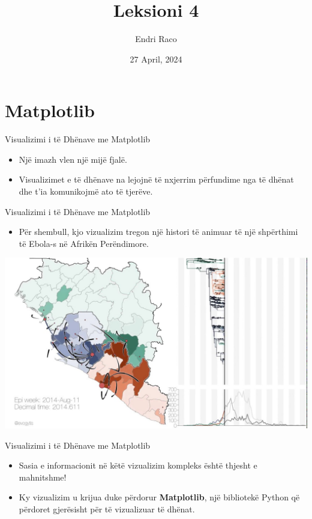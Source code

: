 \documentclass[
  ignorenonframetext,
]{beamer}
\title{Leksioni 4}
\author{Endri Raco}
\date{27 April, 2024}
\providecommand{\tightlist}{%
  \setlength{\itemsep}{0pt}\setlength{\parskip}{0pt}}
\begin{document}
\frame{\titlepage}

\begin{frame}[allowframebreaks]
  \tableofcontents[hideallsubsections]
\end{frame}
\hypertarget{matplotlib}{%
\section{Matplotlib}\label{matplotlib}}

\begin{frame}{Visualizimi i të Dhënave me Matplotlib}
\protect\hypertarget{visualizimi-i-tuxeb-dhuxebnave-me-matplotlib}{}
\begin{itemize}
\item
  Një imazh vlen një mijë fjalë.
\item
  Visualizimet e të dhënave na lejojnë të nxjerrim përfundime nga të
  dhënat dhe t'ia komunikojmë ato të tjerëve.
\end{itemize}
\end{frame}

\begin{frame}{Visualizimi i të Dhënave me Matplotlib}
\protect\hypertarget{visualizimi-i-tuxeb-dhuxebnave-me-matplotlib-1}{}
\begin{itemize}
\tightlist
\item
  Për shembull, kjo vizualizim tregon një histori të animuar të një
  shpërthimi të Ebola-s në Afrikën Perëndimore.
\end{itemize}

\includegraphics{./Figs/matplot1.png}
\end{frame}

\begin{frame}{Visualizimi i të Dhënave me Matplotlib}
\protect\hypertarget{visualizimi-i-tuxeb-dhuxebnave-me-matplotlib-2}{}
\begin{itemize}
\item
  Sasia e informacionit në këtë vizualizim kompleks është thjesht e
  mahnitshme!
\item
  Ky vizualizim u krijua duke përdorur \textbf{Matplotlib}, një
  bibliotekë Python që përdoret gjerësisht për të vizualizuar të dhënat.
\end{itemize}
\end{frame}
\end{document}
